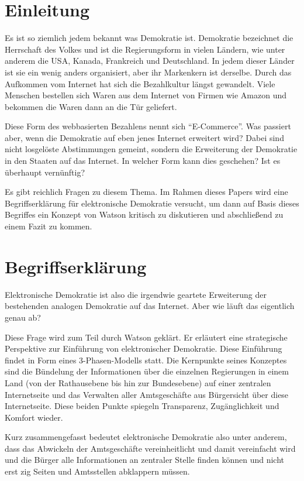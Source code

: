 \documentclass[12pt,twoside,ngerman]{scrartcl}
\theoremstyle{plain}
\theoremstyle{definition}
\theoremstyle{remark}
\begin{document}
\section{Einleitung}
\label{sec:introduction}

	Es ist so ziemlich jedem bekannt was Demokratie ist. Demokratie bezeichnet die Herrschaft des Volkes und ist die Regierungsform in vielen Ländern, wie unter anderem die USA, Kanada, Frankreich und Deutschland. In jedem dieser Länder ist sie ein wenig anders organisiert, aber ihr Markenkern ist derselbe. Durch das Aufkommen vom Internet hat sich die Bezahlkultur längst gewandelt. Viele Menschen bestellen sich Waren aus dem Internet von Firmen wie Amazon und bekommen die Waren dann an die Tür geliefert.
	
	Diese Form des webbasierten Bezahlens nennt sich "`E-Commerce"'. Was passiert aber, wenn die Demokratie auf eben jenes Internet erweitert wird? Dabei sind nicht losgelöste Abstimmungen gemeint, sondern die Erweiterung der Demokratie in den Staaten auf das Internet. In welcher Form kann dies geschehen? Ist es überhaupt vernünftig?
	
	Es gibt reichlich Fragen zu diesem Thema. Im Rahmen dieses Papers wird eine Begriffserklärung für elektronische Demokratie versucht, um dann auf Basis dieses Begriffes ein Konzept von Watson\cite{Watson2001} kritisch zu diskutieren und abschließend zu einem Fazit zu kommen.
	
\section{Begriffserklärung}
\label{sec:definition}

	Elektronische Demokratie ist also die irgendwie geartete Erweiterung der bestehenden analogen Demokratie auf das Internet. Aber wie läuft das eigentlich genau ab?
	
	Diese Frage wird zum Teil durch Watson\cite{Watson2001} geklärt. Er erläutert eine strategische Perspektive zur Einführung von elektronischer Demokratie. Diese Einführung findet in Form eines 3-Phasen-Modells statt. 
	Die Kernpunkte seines Konzeptes sind die Bündelung der Informationen über die einzelnen Regierungen in einem Land (von der Rathausebene bis hin zur Bundesebene) auf einer zentralen Internetseite und das Verwalten aller Amtsgeschäfte aus Bürgersicht über diese Internetseite. Diese beiden Punkte spiegeln Transparenz, Zugänglichkeit und Komfort wieder.
	
	Kurz zusammengefasst bedeutet elektronische Demokratie also unter anderem, dass das Abwickeln der Amtsgeschäfte vereinheitlicht und damit vereinfacht wird und die Bürger alle Informationen an zentraler Stelle finden können und nicht erst zig Seiten und Amtsstellen abklappern müssen.
	
\end{document}
